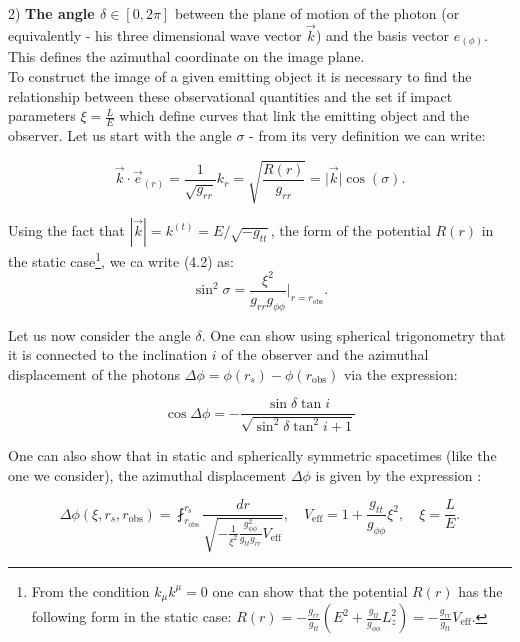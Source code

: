 \documentclass[12pt]{article}
\numberwithin{equation}{section}
\numberwithin{figure}{section}
\begin{document}
	2) \textbf{The angle $\delta\in[0,2\pi]$} between the plane of motion of the photon (or equivalently - his three dimensional wave vector $\vec{k}$) and the basis vector $e_{(\phi)}$. This defines the azimuthal coordinate on the image plane.\\
	
	To construct the image of a given emitting object it is necessary to find the relationship between these observational quantities and the set if impact parameters $\xi = \frac{L}{E}$ which define curves that link the emitting object and the observer. Let us start with the angle $\sigma$ - from its very definition we can write:
	
	\begin{equation}
		\vec{k} \cdot \vec{e}_{(r)} = \frac{1}{\sqrt{g_{rr}}}k_{r} = \sqrt{\frac{R(r)}{g_{rr}}} =  \big\vert \vec{k}\big\vert \cos(\sigma).
	\end{equation}
	\newpage
	
	Using the fact that $|\vec{k}| = k^{(t)} = E/\sqrt{-g_{tt}}$,  the form of the potential $R(r)$ in the static case\footnote{From the condition $k_\mu k^\mu = 0$ one can show that the potential $R(r)$ has the following form in the static case: $R(r) = -\frac{g_{rr}}{g_{tt}}\left(E^2 + \frac{g_{tt}}{g_{\phi\phi}}L_z^2\right) = -\frac{g_{rr}}{g_{tt}} V_\text{eff}$.}, we ca write (4.2) as:
	\begin{equation}
		\sin^2\sigma = \frac{\xi^2}{g_{rr}g_{\phi\phi}}\bigg\vert_{r = r_\text{obs}}.
	\end{equation}
	
	Let us now consider the angle $\delta$. One can show using spherical trigonometry \cite{Muller2009} that it is connected to the inclination $i$ of the observer and the azimuthal displacement of the photons $\Delta\phi = \phi(r_s) - \phi(r_\text{obs})$ via the expression:

	\begin{equation}
		\cos\Delta\phi = - \frac{\sin\delta\tan i}{\sqrt{\sin^2\delta\tan^2 i + 1}}
	\end{equation}
	
	One can also show that in static and spherically symmetric spacetimes (like the one we consider), the azimuthal displacement $\Delta\phi$ is given by the expression \cite{Muller2009}:

	\begin{equation}
		\Delta\phi(\xi,r_s,r_\text{obs}) = \fint_{r_\text{obs}}^{r_\text{s}}\frac{dr}{\sqrt{-\frac{1}{\xi^2}\frac{g^2_{\phi\phi}}{g_{tt}g_{rr}}V_\text{eff}}},\quad V_\text{eff} = 1 + \frac{g_{tt}}{g_{\phi\phi}}\xi^2,\quad \xi = \frac{L}{E}.
	\end{equation}
	
\end{document}
